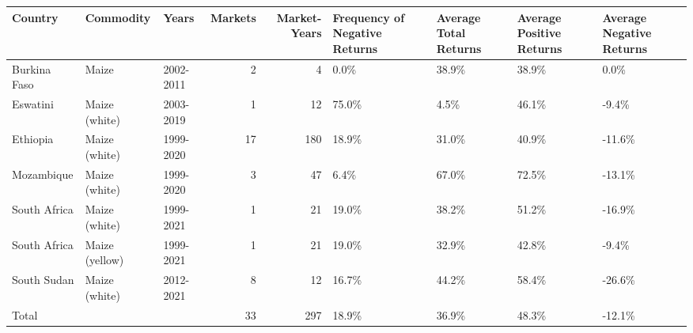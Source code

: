 \begin{table}[ht]
\centering
\begin{tabular}{lllrrllll}
  \hline
Country & Commodity & Years & Markets & Market-Years & Frequency of Negative Returns & Average Total Returns & Average Positive Returns & Average Negative Returns \\ 
  \hline
Burkina Faso & Maize & 2002-2011 &   2 &   4 & 0.0\% & 38.9\% & 38.9\% & 0.0\% \\ 
  Eswatini & Maize (white) & 2003-2019 &   1 &  12 & 75.0\% & 4.5\% & 46.1\% & -9.4\% \\ 
  Ethiopia & Maize (white) & 1999-2020 &  17 & 180 & 18.9\% & 31.0\% & 40.9\% & -11.6\% \\ 
  Mozambique & Maize (white) & 1999-2020 &   3 &  47 & 6.4\% & 67.0\% & 72.5\% & -13.1\% \\ 
  South Africa & Maize (white) & 1999-2021 &   1 &  21 & 19.0\% & 38.2\% & 51.2\% & -16.9\% \\ 
  South Africa & Maize (yellow) & 1999-2021 &   1 &  21 & 19.0\% & 32.9\% & 42.8\% & -9.4\% \\ 
  South Sudan & Maize (white) & 2012-2021 &   8 &  12 & 16.7\% & 44.2\% & 58.4\% & -26.6\% \\ 
  Total &  &  &  33 & 297 & 18.9\% & 36.9\% & 48.3\% & -12.1\% \\ 
   \hline
\end{tabular}
\end{table}
